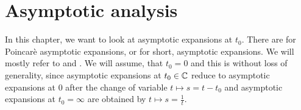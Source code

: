 \section{Asymptotic analysis}
\begin{comment}
  \begin{multicols}{2}
    ´classical'
    \begin{itemize}
      \item \cite[60]{sabbah_cimpa90} Chapter II.2.2
        \begin{itemize}
          \item \cite{sabbah2000equations}
        \end{itemize}
      \item \textbf{\textcolor{blue}{Van der Put:
            \cite[Chapter 7]{van2003galois}: Exact Asymptotics}}
      \item \cite{majima1984asymptotic}
      \item \cite[Sec.4.4]{Balser2000Formal}
      \item \cite{Loday1994}
      \item \textbf{\textcolor{blue}{\cite{Loday2014} Chapter 2}}
    \end{itemize}
    \columnbreak
    ´sheafical'
    \begin{itemize}
      \item \textbf{\textcolor{red}{\cite[II.5]{sabbah2007isomonodromic}}}
    \end{itemize}
  \end{multicols}
  \TODO[\cite{sibuya1990Linear} Appendix A.3]
\end{comment}
In this chapter, we want to look at asymptotic expansions at $t_0$.
There are  for Poincarè asymptotic
expansions, or for short, asymptotic expansions.
We will mostly refer to \cite[chapter 2]{Loday2014} and
\cite[chapter 7]{van2003galois}.
We will assume, that $t_0=0$ and this is without loss of generality, since
asymptotic expansions at $t_0\in\mathbb{C}$ reduce to asymptotic expansions at $0$
after the change of variable $t\mapsto s=t-t_0$ and asymptotic expansions at
$t_0=\infty$ are obtained by $t\mapsto s=\frac{1}{t}$.

